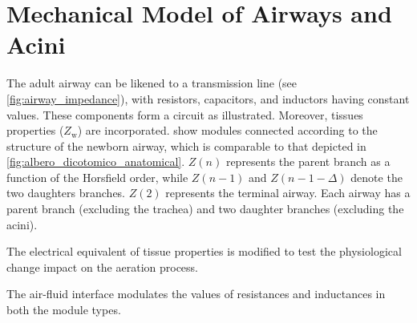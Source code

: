 \section{Mechanical Model of Airways and Acini}




The adult airway can be likened to a transmission line (see
\cref{fig:airway_impedance}), with resistors, capacitors, and
inductors having constant values.  These components form a circuit as
illustrated.  Moreover, tissues properties ($Z_{\text{w}}$) are
incorporated.   show
modules connected according to the structure of the newborn airway,
which is comparable to that depicted in
\cref{fig:albero_dicotomico_anatomical}.  $Z(n)$ represents the parent
branch as a function of the Horsfield order, while $Z(n-1)$ and
$Z(n-1-\Delta)$ denote the two daughters branches.  $Z(2)$ represents
the terminal airway.  Each airway has a parent branch (excluding the
trachea) and two daughter branches (excluding the acini).


The electrical equivalent of tissue properties is modified to test
the physiological change impact on the aeration process.


The air-fluid interface modulates the values of resistances and
inductances in both the module types.

